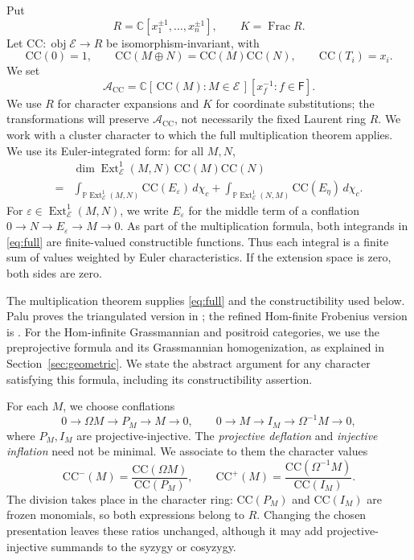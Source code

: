 \documentclass[11pt]{amsart}
\numberwithin{equation}{section}
\theoremstyle{definition}
\theoremstyle{remark}
\newcommand{\op}[1]{\operatorname{#1}}
\newcommand{\E}{\mathcal E}
\newcommand{\CC}{\mathrm{CC}}
\newcommand{\kk}{\mathbb C}
\newcommand{\PP}{\mathbb P}
\newcommand{\Ext}{\op{Ext}}
\newcommand{\Frac}{\op{Frac}}
\newcommand{\eps}{\varepsilon}
\begin{document}
Put
\[ R=\kk[x_1^{\pm1},\ldots,x_n^{\pm1}],\qquad K=\Frac R. \]
Let $\CC:\op{obj}\E\to R$ be isomorphism-invariant, with
\[ \CC(0)=1,\qquad \CC(M\oplus N)=\CC(M)\CC(N),\qquad \CC(T_i)=x_i. \]
We set
\[ \mathscr A_\CC=\kk[\,\CC(M):M\in\E\,][x_f^{-1}:f\in \mathsf F]. \]
We use $R$ for character expansions and $K$ for coordinate
substitutions; the transformations will preserve $\mathscr A_\CC$,
not necessarily the fixed Laurent ring $R$.
We work with a cluster character to which the full multiplication theorem
applies. We use its Euler-integrated form: for all $M,N$,
\begin{equation}\label{eq:full}
\begin{aligned}
 &\dim\Ext^1_\E(M,N)\,\CC(M)\CC(N)\\
 =&\int_{\PP\Ext^1_\E(M,N)}\CC(E_\eps)\,d\chi_c
       +\int_{\PP\Ext^1_\E(N,M)}\CC(E_\eta)\,d\chi_c.
\end{aligned}
\end{equation}
For $\eps\in\Ext^1_\E(M,N)$, we write $E_\eps$ for the middle
term of a conflation $0\to N\to E_\eps\to M\to0$. As part of the
multiplication formula, both integrands in \eqref{eq:full} are finite-valued
constructible functions.
Thus each integral is a finite sum of values weighted by Euler
characteristics. If the extension space is zero, both sides are zero.

The multiplication theorem supplies \eqref{eq:full} and the
constructibility used below. Palu proves
the triangulated version in \cite[Theorem~1.1]{Pal12}; the refined
Hom-finite Frobenius version is \cite[Theorem~3.6]{KPQ}. For the
Hom-infinite Grassmannian and positroid categories, we use the
preprojective formula and its Grassmannian homogenization, as explained
in Section~\ref{sec:geometric}. We state the abstract argument for any
character satisfying this formula, including its constructibility
assertion.

For each $M$, we choose conflations
\begin{equation}\label{eq:presentations} 0\longrightarrow\Omega M\longrightarrow P_M\longrightarrow M \longrightarrow0, \qquad 0\longrightarrow M\longrightarrow I_M\longrightarrow\Omega^{-1}M \longrightarrow0,\end{equation}
where $P_M,I_M$ are projective-injective. The \emph{projective deflation} and \emph{injective inflation} need not be minimal. We associate to them the character values
\begin{equation}\label{eq:normalized} \CC^-(M)=\frac{\CC(\Omega M)}{\CC(P_M)},\qquad \CC^+(M)=\frac{\CC(\Omega^{-1}M)}{\CC(I_M)}.\end{equation}
The division takes place in the character ring: $\CC(P_M)$ and
$\CC(I_M)$ are frozen monomials, so both expressions belong to $R$.
Changing the chosen presentation leaves these ratios unchanged, although
it may add projective-injective summands to the syzygy or cosyzygy.
\end{document}
